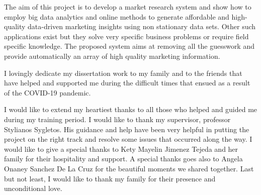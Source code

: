 \begin{summary}
 
The aim of this project is to develop a market research system and show how to employ big data analytics and online methods to generate affordable and high-quality data-driven marketing insights using non stationary data sets. Other such applications exist but they solve very specific business problems or require field specific knowledge. The proposed system aims at removing all the guesswork and provide automatically an array of high quality marketing information. 
  
  
\end{summary}

\begin{dedication}
	
I lovingly dedicate my dissertation work to my family and to the friends that have helped and supported me during the difficult times that ensued as a result of the COVID-19 pandemic.
  
\end{dedication}

\begin{acknowledgements}
	
I would like to extend my heartiest thanks to all those who helped and guided me during my training period. I would like to thank my supervisor, professor Stylianos Sygletos. His guidance and help have been very helpful in putting the project on the right track and resolve some issues that occurred along the way. I would like to give a special thanks to Kety Mayelin Jimenez Tejeda and her family for their hospitality and support. A special thanks goes also to Angela Onaney Sanchez De La Cruz for the beautiful moments we shared together. Last but not least, I would like to thank my family for their presence and unconditional love.

\end{acknowledgements}

